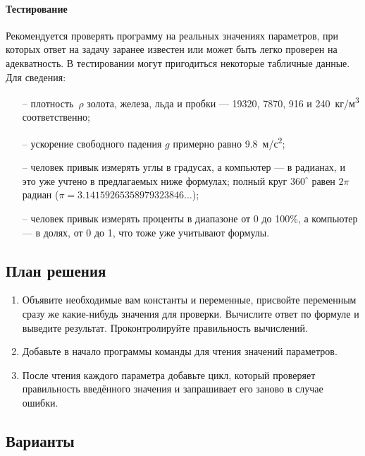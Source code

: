 \paragraph{Тестирование}
Рекомендуется проверять программу на реальных значениях параметров, при
которых ответ на задачу заранее известен или может быть легко проверен на
адекватность. В тестировании могут пригодиться некоторые табличные данные.
Для сведения:
%
\begin{itemize}
%
\item[--] плотность~$\rho$ золота, железа, льда и пробки ---
19320, 7870, 916 и 240~кг/м\textsuperscript{3} соответственно;
%
\item[--] ускорение свободного падения $g$ примерно равно 
9.8~м/с\textsuperscript{2};
%
\item[--] человек привык измерять углы в градусах, а компьютер ---
в радианах, и это уже учтено в предлагаемых ниже формулах;
полный круг $360^{\circ}$ равен $2\pi$ радиан ($\pi = 3.14159265358979323846\dots$);
%
\item[--] человек привык измерять проценты в диапазоне от 0 до 100\%,
а компьютер --- в долях, от 0 до 1, что тоже уже учитывают формулы.
\end{itemize}


\subsection*{План решения}


\begin{enumerate}
\item Объявите необходимые вам константы и переменные, присвойте переменным
сразу же какие-нибудь значения для проверки. Вычислите ответ по формуле и
выведите результат. Проконтролируйте правильность вычислений.
%
\item Добавьте в начало программы команды для чтения значений параметров.
%
\item После чтения каждого параметра добавьте цикл, который проверяет
правильность введённого значения и запрашивает его заново в случае ошибки.
\end{enumerate}


\subsection*{Варианты}


